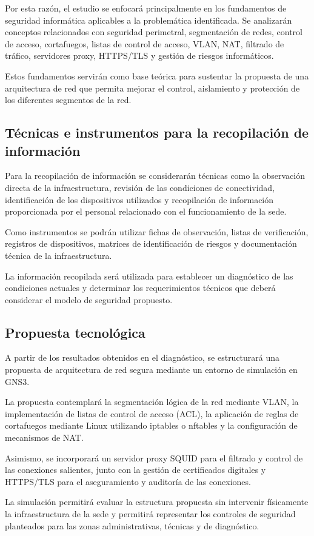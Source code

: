 Por esta razón, el estudio se enfocará principalmente en los fundamentos de seguridad informática aplicables a la problemática identificada. Se analizarán conceptos relacionados con seguridad perimetral, segmentación de redes, control de acceso, cortafuegos, listas de control de acceso, VLAN, NAT, filtrado de tráfico, servidores proxy, HTTPS/TLS y gestión de riesgos informáticos.

Estos fundamentos servirán como base teórica para sustentar la propuesta de una arquitectura de red que permita mejorar el control, aislamiento y protección de los diferentes segmentos de la red.

\subsection{Técnicas e instrumentos para la recopilación de información}

Para la recopilación de información se considerarán técnicas como la observación directa de la infraestructura, revisión de las condiciones de conectividad, identificación de los dispositivos utilizados y recopilación de información proporcionada por el personal relacionado con el funcionamiento de la sede.

Como instrumentos se podrán utilizar fichas de observación, listas de verificación, registros de dispositivos, matrices de identificación de riesgos y documentación técnica de la infraestructura.

La información recopilada será utilizada para establecer un diagnóstico de las condiciones actuales y determinar los requerimientos técnicos que deberá considerar el modelo de seguridad propuesto.

\subsection{Propuesta tecnológica}

A partir de los resultados obtenidos en el diagnóstico, se estructurará una propuesta de arquitectura de red segura mediante un entorno de simulación en GNS3.

La propuesta contemplará la segmentación lógica de la red mediante VLAN, la implementación de listas de control de acceso (ACL), la aplicación de reglas de cortafuegos mediante Linux utilizando iptables o nftables y la configuración de mecanismos de NAT.

Asimismo, se incorporará un servidor proxy SQUID para el filtrado y control de las conexiones salientes, junto con la gestión de certificados digitales y HTTPS/TLS para el aseguramiento y auditoría de las conexiones.

La simulación permitirá evaluar la estructura propuesta sin intervenir físicamente la infraestructura de la sede y permitirá representar los controles de seguridad planteados para las zonas administrativas, técnicas y de diagnóstico.
